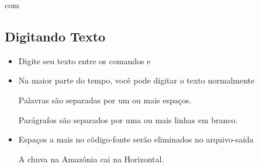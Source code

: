 \documentclass{beamer}
\begin{document}
\begin{frame}[fragile]{\insertsubsection{} com \wllogo}
\end{frame}

\subsection{Digitando Texto}
\begin{frame}[fragile]{\insertsubsection{}}
\small
\begin{itemize}
  \item Digite seu texto entre os comandos  e 
  \item Na maior parte do tempo, você pode digitar o texto normalmente
  \begin{exampletwouptiny}
Palavras são separadas por um ou mais
espaços.

Parágrafos são separados por uma
ou mais linhas em branco.
  \end{exampletwouptiny}
  \item Espaços a mais no código-fonte serão eliminados no arquivo-saída
  \begin{exampletwouptiny}
A    chuva   na       Amazônia
cai    na Horizontal.
  \end{exampletwouptiny}
\end{itemize}
\end{frame}
\end{document}
